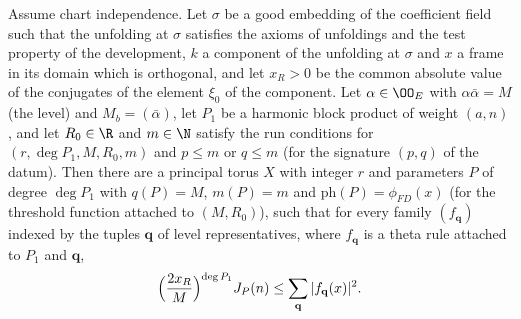 \begin{theorem}\label{pf:onto1:thetaLower}
Assume chart independence. Let $\sigma$ be a good embedding of the coefficient field such that the unfolding at $\sigma$
satisfies the axioms of unfoldings and the test property of the development, $k$ a component of the unfolding at
$\sigma$ and $x$ a frame in its domain which is orthogonal, and let $x_R>0$ be the common absolute value of the conjugates of the
element $\xi_0$ of the component. Let $\alpha\in\OO_E$ with $\alpha\bar\alpha=M$ (the level) and $M_b=(\bar\alpha)$, let $P_1$ be a
harmonic block product of weight $(a,n)$, and let $R_0\in\R$ and $m\in\N$ satisfy the run conditions for $(r,\deg P_1,M,R_0,m)$ and
$p\le m$ or $q\le m$ (for the signature $(p,q)$ of the datum). Then there are a principal torus $X$ with integer $r$ and
parameters $P$ of degree $\deg P_1$ with $q(P)=M$, $m(P)=m$ and $\mathrm{ph}(P)=\phi_{FD}(x)$ (for the threshold function attached to
$(M,R_0)$), such that for every family $(f_{\mathbf q})$ indexed by the tuples $\mathbf q$ of level representatives, where $f_{\mathbf q}$
is a theta rule attached to $P_1$ and $\mathbf q$,
\[
\Bigl(\frac{2x_R}M\Bigr)^{\deg P_1}J_P(n)\le\sum_{\mathbf q}|f_{\mathbf q}(x)|^2 .
\]
\end{theorem}


